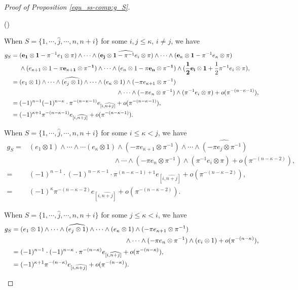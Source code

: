 \documentclass[pdflatex,sn-mathphys-num]{sn-jnl}%
\theoremstyle{thmstyleone}%
\theoremstyle{thmstyletwo}%
\numberwithin{equation}{subsection}
\theoremstyle{thmstylethree}%
\newcommand{\wh}{\widehat}
\newenvironment{altenumerate}
	{\begin{list}
			{(\theenumi) }
			{\usecounter{enumi}
				\setlength{\labelwidth}{0pt}
				\setlength{\labelsep}{0pt}
				\setlength{\leftmargin}{0pt}
				\setlength{\itemsep}{\the\smallskipamount}
				\renewcommand{\theenumi}{\roman{enumi}}
		}}
		{\end{list}}
\begin{document}
\begin{proof}[Proof of Proposition \ref{equ_ss-comp:g_S}]
\begin{altenumerate}
	\item When $S=\{1,\cdots,\wh{j},\cdots,n,n+i\}$ for some $i,j\leq \kappa$, $i\neq j$, we have
	\begin{align*}
		g_S={}  &(\mathbf{e_1\otimes 1}-\pi^{-1}e_1\otimes \pi)\wedge\cdots\wedge 
		\wh{(\mathbf{e_j\otimes 1}-\pi^{-1}e_i\otimes \pi)}\wedge\cdots\wedge(\mathbf{e_\kappa\otimes 1}-\pi^{-1}e_\kappa\otimes \pi)\\
		&\wedge(e_{\kappa+1}\otimes 1-\mathbf{\pi e_{\kappa+1}\otimes \pi^{-1}})\wedge\cdots\wedge(e_n\otimes 1-\mathbf{\pi e_n\otimes \pi^{-1}})\wedge (\mathbf{\frac{1}{2}e_i\otimes 1}+\frac{1}{2}\pi^{-1}e_i\otimes \pi),\\
		={}     &(e_1\otimes 1)\wedge\cdots\wedge\wh{(e_j\otimes 1)}\wedge\cdots\wedge (e_\kappa\otimes          1)\wedge(-\pi e_{\kappa+1}\otimes \pi^{-1})\\
		&\hspace{5.5cm}
		\wedge\cdots\wedge(-\pi e_n\otimes\pi^{-1})\wedge(\pi^{-1}e_i\otimes \pi)+o(\pi^{-(n-\kappa-1)}),\\
		={}&(-1)^{n-1}(-1)^{n-\kappa}\cdot\pi^{-(n-\kappa-1)}e_{[i,\wh{n+j}]}+o(\pi^{-(n-\kappa-1)}),\\
		={}&(-1)^{\kappa+1}\pi^{-(n-\kappa-1)}e_{[i,\wh{n+j}]}+o(\pi^{-(n-\kappa-1)}).
	\end{align*}
				
	\item When $S=\{1,\cdots,\wh{j},\cdots,n,n+i\}$ for some $i\leq \kappa <j$, we have
	\begin{align*}
		g_S={}&
		(e_1\otimes 1)\wedge\cdots\wedge\cdots(e_\kappa\otimes 1)\wedge(-\pi e_{\kappa+1}\otimes \pi^{-1})\wedge\cdots\wedge\wh{(-\pi e_j\otimes \pi^{-1})}\\
		&\hspace{5cm}\wedge\cdots\wedge(-\pi e_n\otimes \pi^{-1})\wedge(\pi^{-1} e_i\otimes \pi)+o(\pi^{-(n-\kappa-2)}),\\
		={}&(-1)^{n-1}\cdot(-1)^{n-\kappa-1}\cdot\pi^{(n-\kappa-1)+1}e_{[i,\wh{n+j}]}+o(\pi^{-(n-\kappa-2)}),\\
		={}&(-1)^{\kappa}\pi^{-(n-\kappa-2)}e_{[i,\wh{n+j}]}+o(\pi^{-(n-\kappa-2)}).
	\end{align*}
				
				
	\item When $S=\{1,\cdots,\wh{j},\cdots,n,n+i\}$ for some $j\leq \kappa<i$, we have
	\begin{align*}
		g_S={}&
		(e_1\otimes 1)\wedge\cdots\wedge\wh{(e_j\otimes 1)}\wedge\cdots\wedge (e_\kappa\otimes 1)\wedge(-\pi e_{\kappa+1}\otimes \pi^{-1})\\
		&\hspace{5.5cm}
		\wedge\cdots\wedge(-\pi e_n\otimes \pi^{-1})\wedge(e_i\otimes 1)+o(\pi^{-(n-\kappa)}),\\
		={}&(-1)^{n-1}\cdot(-1)^{n-\kappa}\cdot\pi^{-(n-\kappa)}e_{[i,\wh{n+j}]}+o(\pi^{-(n-\kappa)}),\\
		={}&(-1)^{\kappa+1}\pi^{-(n-\kappa)}e_{[i,\wh{n+j}]}+o(\pi^{-(n-\kappa)}).
	\end{align*}
				

\end{altenumerate}
\end{proof}
\end{document}
